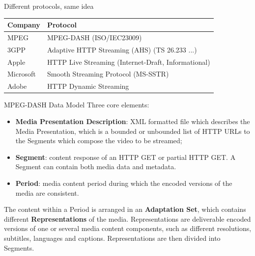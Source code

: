 \documentclass[10pt]{beamer}
\begin{document}
\begin{frame}[fragile]{Different protocols, same idea}
\begin{table}[]
\centering
\label{my-label}
\begin{tabular}{@{}ll@{}}
\toprule
Company   & Protocol                                            \\ \midrule
MPEG      & MPEG-DASH (ISO/IEC23009)                            \\
3GPP      & Adaptive HTTP Streaming (AHS) (TS 26.233 ...)       \\
Apple     & HTTP Live Streaming (Internet-Draft, Informational) \\ 
Microsoft & Smooth Streaming Protocol (MS-SSTR)                 \\
Adobe     & HTTP Dynamic Streaming                              \\ \bottomrule
\end{tabular}
\end{table}
\end{frame}

\begin{frame}[fragile]{MPEG-DASH Data Model}
Three core elements:
\begin{itemize}
\item \textbf{Media Presentation Description}: XML formatted file which describes the Media Presentation, which is a bounded or unbounded list of HTTP URLs to the Segments which compose the video to be streamed;
\item \textbf{Segment}: content response of an HTTP GET or partial HTTP GET. A Segment can contain both media data and metadata.
\item \textbf{Period}: media content period during which the encoded versions of the media are consistent.
\end{itemize}
The content within a Period is arranged in an \textbf{Adaptation Set}, which contains different \textbf{Representations} of the media. Representations are deliverable encoded versions of one or several media content components, such as different resolutions, subtitles, languages and captions. Representations are then divided into Segments.
\end{frame}
\end{document}
